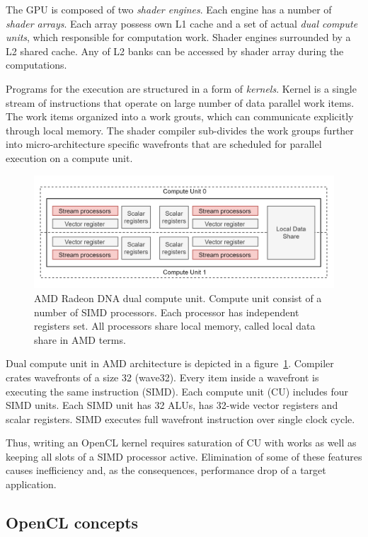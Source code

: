 The GPU is composed of two \textit{shader engines}. Each engine has a number of \textit{shader arrays}. Each array possess own L1 cache and a set of actual \textit{dual compute units}, which responsible for computation work. Shader engines surrounded by a L2 shared cache. Any of L2 banks can be accessed by shader array during the computations.

Programs for the execution are structured in a form of \textit{kernels}. Kernel is a single stream of instructions that operate on large number of data parallel work items. The work items organized into a work grouts, which can communicate explicitly through local memory. The shader compiler sub-divides the work groups further into micro-architecture specific wavefronts that are scheduled for parallel execution on a compute unit.

\begin{figure}[h]
    \centering
    \includegraphics[width=1.0\textwidth]{images/rdna_dcu.png}
    \caption{AMD Radeon DNA dual compute unit. Compute unit consist of a number of SIMD processors. Each processor has independent registers set. All processors share local memory, called local data share in AMD terms.}
    \label{fig:rdna_dcu}
\end{figure}

Dual compute unit in AMD architecture is depicted in a figure~\ref{fig:rdna_dcu}. Compiler crates wavefronts of a size 32 (wave32). Every item inside a wavefront is executing the same instruction (SIMD). Each compute unit (CU) includes four SIMD units. Each SIMD unit has 32 ALUs, has 32-wide vector registers and scalar registers. SIMD executes full wavefront instruction over single clock cycle.

Thus, writing an OpenCL kernel requires saturation of CU with works as well as keeping all slots of a SIMD processor active. Elimination of some of these features causes inefficiency and, as the consequences, performance drop of a target application.

\subsection{OpenCL concepts}

